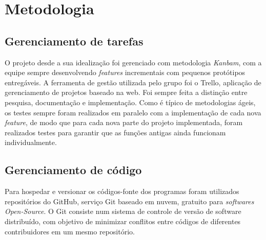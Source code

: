 \chapter{Metodologia}

\section{Gerenciamento de tarefas}
O projeto desde a sua idealização foi gerenciado com metodologia \textit{Kanbam}, com a equipe sempre desenvolvendo \textit{features} incrementais com pequenos protótipos entregáveis. A ferramenta de gestão utilizada pelo grupo foi o Trello, aplicação de gerenciamento de projetos baseado na web. Foi sempre feita a distinção entre pesquisa, documentação e implementação. Como é típico de metodologias ágeis, os testes sempre foram realizados em paralelo com a implementação de cada nova \textit{feature}, de modo que para cada nova parte do projeto implementada, foram realizados testes para garantir que as funções antigas ainda funcionam individualmente.
\section{Gerenciamento de código}
Para hospedar e versionar os códigos-fonte dos programas foram utilizados repositórios do GitHub, serviço Git baseado em nuvem, gratuito para \textit{softwares Open-Source}. O Git consiste num sistema de controle de versão de software distribuído, com objetivo de minimizar conflitos entre códigos de diferentes contribuidores em um mesmo repositório.